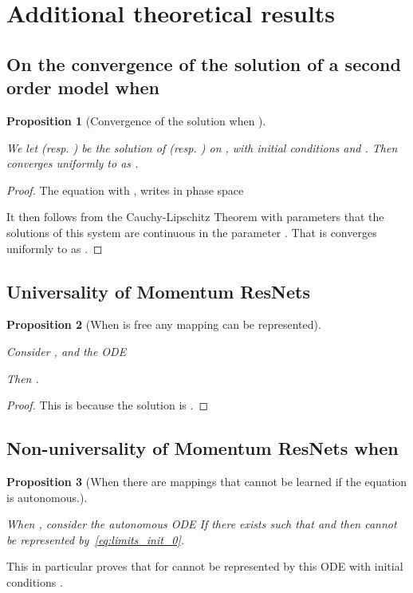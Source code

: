 \documentclass{article}
\newtheorem{proposition}{Proposition}
\begin{document}
\section{Additional theoretical results}\label{app:additional_results}

\subsection{On the convergence of the solution of a second order model when }\label{app:prop_eps_infty}
\begin{proposition}[Convergence of the solution when ]\label{prop:eps_infty}

We let  (resp. ) be the solution of  (resp. ) on , with initial conditions  and .
Then  converges uniformly to  as . 
\end{proposition}

\begin{proof}
The equation  with ,  writes in phase space 


It then follows from the Cauchy-Lipschitz Theorem with parameters \citep[Theorem 2, Chapter 2]{perko2013differential} that the solutions of this system are continuous in the parameter . That is  converges uniformly to  as .

\end{proof}

\subsection{Universality of Momentum ResNets}\label{app:learn_init}

\begin{proposition}[When  is free any mapping can be represented]\label{learn_init_speed}

 Consider , and the ODE
 
 Then .
\end{proposition}

\begin{proof}
This is because the solution is . 
\end{proof}


\subsection{Non-universality of Momentum ResNets when }


\begin{proposition}[When  there are mappings that cannot be learned if the equation is autonomous.]\label{proposition:limits_init_0}

When , consider the autonomous ODE 
If there exists  such that   and  then  cannot be represented by~\eqref{eq:limits_init_0}.
\end{proposition}
This in particular proves that  for  cannot be represented by this ODE with initial conditions . 
\end{document}
